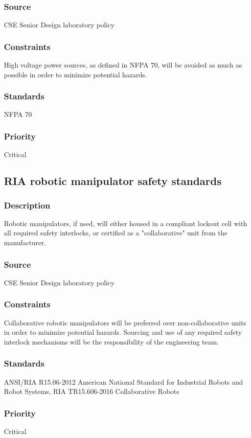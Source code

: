 \subsubsection{Source}
CSE Senior Design laboratory policy
\subsubsection{Constraints}
High voltage power sources, as defined in NFPA 70, will be avoided as much as possible in order to minimize potential hazards.
\subsubsection{Standards}
NFPA 70
\subsubsection{Priority}
Critical

\subsection{RIA robotic manipulator safety standards}
\subsubsection{Description}
Robotic manipulators, if used, will either housed in a compliant lockout cell with all required safety interlocks, or certified as a "collaborative" unit from the manufacturer.
\subsubsection{Source}
CSE Senior Design laboratory policy
\subsubsection{Constraints}
Collaborative robotic manipulators will be preferred over non-collaborative units in order to minimize potential hazards. Sourcing and use of any required safety interlock mechanisms will be the responsibility of the engineering team.
\subsubsection{Standards}
ANSI/RIA R15.06-2012 American National Standard for Industrial Robots and Robot Systems, RIA TR15.606-2016 Collaborative Robots
\subsubsection{Priority}
Critical

